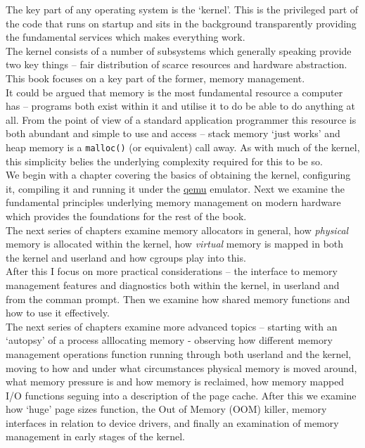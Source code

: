 The key part of any operating system is the `kernel'. This is the privileged
part of the code that runs on startup and sits in the background transparently
providing the fundamental services which makes everything work.\\

The kernel consists of a number of subsystems which generally speaking provide
two key things -- fair distribution of scarce resources and hardware
abstraction. This book focuses on a key part of the former, memory management.\\

It could be argued that memory is the most fundamental resource a computer has
-- programs both exist within it and utilise it to do be able to do anything at
all. From the point of view of a standard application programmer this resource
is both abundant and simple to use and access -- stack memory `just works' and
heap memory is a \texttt{malloc()} (or equivalent) call away. As with
much of the kernel, this simplicity belies the underlying complexity required
for this to be so.\\

We begin with a chapter covering the basics of obtaining the kernel, configuring
it, compiling it and running it under the \href{https://www.qemu.org/}{qemu}
emulator. Next we examine the fundamental principles underlying memory
management on modern hardware which provides the foundations for the rest of the
book.\\

The next series of chapters examine memory allocators in general,
how \emph{physical} memory is allocated within the kernel, how \emph{virtual}
memory is mapped in both the kernel and userland and how cgroups play into this.\\

After this I focus on more practical considerations -- the interface to memory
management features and diagnostics both within the kernel, in userland and from
the comman prompt. Then we examine how shared memory functions and how to use it
effectively.\\

The next series of chapters examine more advanced topics -- starting with an
`autopsy' of a process alllocating memory - observing how different memory
management operations function running through both userland and the kernel,
moving to how and under what circumstances physical memory is moved around, what
memory pressure is and how memory is reclaimed, how memory mapped I/O functions
seguing into a description of the page cache. After this we examine how `huge'
page sizes function, the Out of Memory (OOM) killer, memory interfaces in
relation to device drivers, and finally an examination of memory management in
early stages of the kernel.\\

